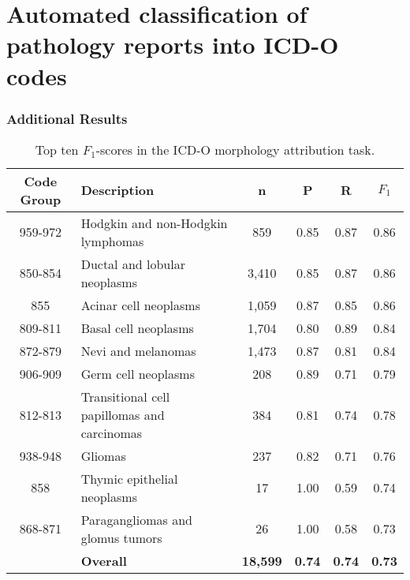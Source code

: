 \section*{Automated classification of pathology reports into ICD-O codes}


\begin{frame}
	\frametitle{Additional Results\footnotemark}
\begin{table}[htbp]
    	\footnotesize
\caption{Top ten $F_1$-scores in the ICD-O morphology attribution task.}
\myfloatalign
\begin{tabular}{clcccc}
    \toprule
	{\bf Code Group} & {\bf Description} & {\bf n} & {\bf P} & {\bf R} & {\bf $F_1$} \\
	\midrule
    959-972 & Hodgkin and non-Hodgkin lymphomas & 859 & 0.85 & 0.87 & 0.86 \\
	850-854 & Ductal and lobular neoplasms & 3,410 & 0.85 & 0.87 & 0.86 \\
	855 & Acinar cell neoplasms & 1,059 & 0.87 & 0.85 & 0.86 \\
	809-811 & Basal cell neoplasms & 1,704 & 0.80 & 0.89 & 0.84 \\
	872-879 & Nevi and melanomas & 1,473 & 0.87 & 0.81 & 0.84 \\
	906-909 & Germ cell neoplasms & 208 & 0.89 & 0.71 & 0.79 \\
	812-813 & Transitional cell papillomas and carcinomas & 384 & 0.81 & 0.74 & 0.78 \\
	938-948 & Gliomas & 237 & 0.82 & 0.71 & 0.76 \\
	858 & Thymic epithelial neoplasms & 17 & 1.00 & 0.59 & 0.74 \\
	868-871 & Paragangliomas and glomus tumors & 26 & 1.00 & 0.58 & 0.73 \\
	\midrule
	& {\bf Overall} & {\bf 18,599} & {\bf 0.74} & {\bf 0.74} & {\bf 0.73} \\
	\bottomrule
    \end{tabular}
  \label{tab:morpho_efficiency}
\end{table}

\end{frame}


